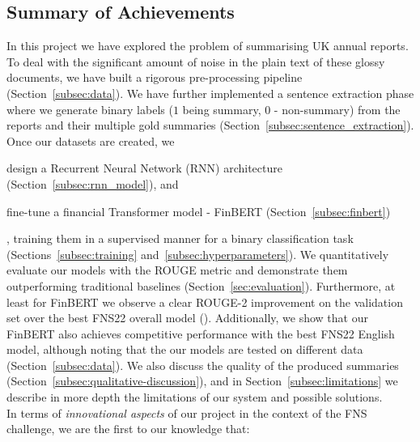 \subsection{Summary of Achievements}\label{subsec:summary}
In this project we have explored the problem of summarising UK annual reports.
To deal with the significant amount of noise in the plain text of these glossy documents, we have built a rigorous pre-processing pipeline (Section~\ref{subsec:data}).
We have further implemented a sentence extraction phase where we generate binary labels ($1$ being summary, $0$ - non-summary) from the reports and their multiple gold summaries (Section~\ref{subsec:sentence_extraction}).
Once our datasets are created, we
\begin{enumerate*}
    \item design a Recurrent Neural Network (RNN) architecture (Section~\ref{subsec:rnn_model}), and
    \item fine-tune a financial Transformer model - FinBERT (Section~\ref{subsec:finbert})
\end{enumerate*},
training them in a supervised manner for a binary classification task (Sections~\ref{subsec:training} and~\ref{subsec:hyperparameters}).
We quantitatively evaluate our models with the ROUGE metric and demonstrate them outperforming traditional baselines (Section~\ref{sec:evaluation}).
Furthermore, at least for FinBERT we observe a clear ROUGE-2 improvement on the validation set over the best FNS22 overall model (\cite{foroutan-etal-2022-multilingual}).
Additionally, we show that our FinBERT also achieves competitive performance with the best FNS22 English model,
although noting that the our models are tested on different data (Section~\ref{subsec:data}).
We also discuss the quality of the produced summaries (Section~\ref{subsec:qualitative-discussion}), and in
Section~\ref{subsec:limitations} we describe in more depth the limitations of our system and possible solutions.
\\
In terms of \emph{innovational aspects} of our project in the context of the FNS challenge, we are the first to our knowledge that:
